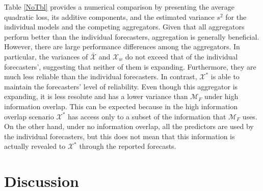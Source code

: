 \documentclass[11pt]{article}
\theoremstyle{definition}
\theoremstyle{definition}
\begin{document}
%
Table \ref{NoTbl} provides a numerical comparison by presenting the average quadratic loss, its additive components, and the estimated variance $s^2$ for the individual models and the competing aggregators.  Given that all aggregators perform better than the individual forecasters, aggregation is generally beneficial. However, there are large performance differences among the aggregators. In particular, the variances of $\bar{\mathcal{X}}$ and $\mathcal{X}_w$  do not exceed that of the individual forecasters', suggesting that neither of them is expanding. Furthermore, they are much less reliable than the individual forecasters. In contrast, $\mathcal{X}^*$ is able to maintain the forecasters' level of reliability. Even though this aggregator is expanding, it is less resolute and has a lower variance than $\mathcal{M}_F$ under high information overlap. This can be expected because in the high information overlap scenario $\mathcal{X}^*$ has access only to a subset of the information that $\mathcal{M}_F$ uses. On the other hand, under no information overlap, all the predictors are  used by the individual forecasters, but this does not mean that this information is actually revealed to $\mathcal{X}^*$ through the reported forecasts. 

\section{Discussion} \label{conclusion}
\end{document}
